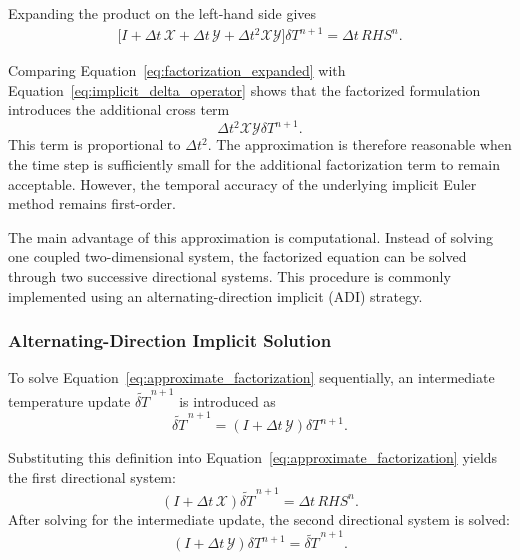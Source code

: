Expanding the product on the left-hand side gives
\begin{equation}
\begin{aligned}
\Big[
I+\Delta t\,\mathcal{X}
+\Delta t\,\mathcal{Y}
+\Delta t^2\mathcal{X}\mathcal{Y}
\Big]\delta T^{n+1}
=
\Delta t\,RHS^n.
\end{aligned}
\label{eq:factorization_expanded}
\end{equation}

Comparing Equation~\eqref{eq:factorization_expanded} with
Equation~\eqref{eq:implicit_delta_operator} shows that
the factorized formulation introduces the additional
cross term
\begin{equation}
\Delta t^2\mathcal{X}\mathcal{Y}\delta T^{n+1}.
\label{eq:factorization_error_term}
\end{equation}
This term is proportional to $\Delta t^2$. The approximation
is therefore reasonable when the time step is sufficiently
small for the additional factorization term to remain
acceptable. However, the temporal accuracy of the underlying
implicit Euler method remains first-order.

The main advantage of this approximation is computational.
Instead of solving one coupled two-dimensional system, the
factorized equation can be solved through two successive
directional systems. This procedure is commonly implemented
using an alternating-direction implicit (ADI) strategy.

\subsubsection{Alternating-Direction Implicit Solution}

To solve Equation~\eqref{eq:approximate_factorization}
sequentially, an intermediate temperature update
$\widetilde{\delta T}^{\,n+1}$ is introduced as
\begin{equation}
\widetilde{\delta T}^{\,n+1}
=
\left(I+\Delta t\,\mathcal{Y}\right)
\delta T^{n+1}.
\label{eq:intermediate_update}
\end{equation}

Substituting this definition into
Equation~\eqref{eq:approximate_factorization} yields
the first directional system:
\begin{equation}
\boxed{
\left(I+\Delta t\,\mathcal{X}\right)
\widetilde{\delta T}^{\,n+1}
=
\Delta t\,RHS^n.
}
\label{eq:adi_step_x}
\end{equation}
After solving for the intermediate update, the second
directional system is solved:
\begin{equation}
\boxed{
\left(I+\Delta t\,\mathcal{Y}\right)
\delta T^{n+1}
=
\widetilde{\delta T}^{\,n+1}.
}
\label{eq:adi_step_y}
\end{equation}

